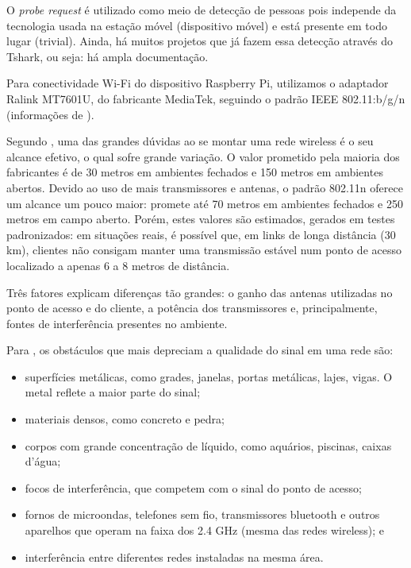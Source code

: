 O \emph{probe request} é utilizado como meio de detecção de pessoas pois
independe da tecnologia usada na estação móvel (dispositivo móvel) e está presente em todo lugar (trivial). Ainda, há muitos projetos que já fazem essa detecção através do Tshark, ou seja: há ampla documentação.

Para conectividade Wi-Fi do dispositivo Raspberry Pi, utilizamos o adaptador Ralink MT7601U, do fabricante MediaTek, seguindo o padrão IEEE 802.11:b/g/n (informações de ).

Segundo , uma das grandes dúvidas ao se montar uma rede wireless é o seu alcance efetivo, o qual sofre grande variação. O valor prometido pela maioria dos fabricantes é de 30 metros em ambientes fechados e 150 metros em ambientes abertos. Devido ao uso de mais transmissores e antenas, o padrão 802.11n oferece um alcance um pouco maior: promete até 70 metros em ambientes fechados e 250 metros em campo aberto. Porém, estes valores são estimados, gerados em testes padronizados: em situações reais, é possível que, em links de longa distância (30 km), clientes não consigam manter uma transmissão estável num ponto de acesso localizado a apenas 6 a 8 metros de distância.

Três fatores explicam diferenças tão grandes: o ganho das antenas utilizadas no ponto de acesso e do cliente, a potência dos transmissores e, principalmente, fontes de interferência presentes no ambiente.

Para , os obstáculos que mais depreciam a qualidade do sinal em uma rede são:

\begin{itemize}
  \item superfícies metálicas, como grades, janelas, portas metálicas, lajes, vigas. O metal reflete a maior parte do sinal;
  \item materiais densos, como concreto e pedra;
  \item corpos com grande concentração de líquido, como aquários, piscinas, caixas d'água;
	\item focos de interferência, que competem com o sinal do ponto de acesso;
	\item fornos de microondas, telefones sem fio, transmissores bluetooth e outros aparelhos que operam na faixa dos 2.4 GHz (mesma das redes wireless); e
  \item interferência entre diferentes redes instaladas na mesma área.
\end{itemize}

